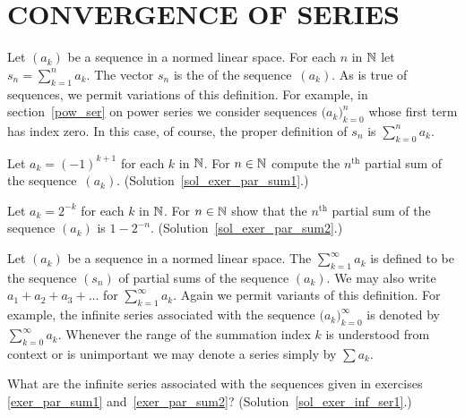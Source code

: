 \section{CONVERGENCE OF SERIES}
\begin{defn}  Let $(a_k)$ be a sequence in a normed linear space. For each $n$ in $\mathbb{N}$ let
$s_n = \sum_{k=1}^n a_k$.  The vector $s_n$ is the
 of the sequence~$(a_k)$.  As is true of sequences, we permit
variations of this definition.  For example, in section~\ref{pow_ser} on power series we
consider sequences $\bigl(a_k\bigr)_{k=0}^n$ whose first term has index zero.  In this case,
of course, the proper definition of $s_n$ is $\sum_{k=0}^n a_k$.
\end{defn}

\begin{exer}\label{exer_par_sum1}  Let $a_k = (-1)^{k+1}$ for each $k$ in $\mathbb{N}$.  For $n \in \mathbb{N}$
compute the $n^{\text{th}}$ partial sum of the sequence~$(a_k)$.
(Solution~\ref{sol_exer_par_sum1}.)
\end{exer}

\begin{exer}\label{exer_par_sum2}  Let $a_k = 2^{-k}$ for each $k$ in $\mathbb{N}$.  For $n \in \mathbb{N}$ show
that the $n^{\text{th}}$ partial sum of the sequence $(a_k)$ is $1 - 2^{-n}$.
(Solution~\ref{sol_exer_par_sum2}.)
\end{exer}

\begin{defn}  Let $(a_k)$ be a sequence in a normed linear space.  The
 $\sum_{k=1}^\infty a_k$ is defined to be the sequence $(s_n)$ of partial
sums of the sequence $(a_k)$.  We may also write $a_1 + a_2 + a_3 + \dots$ for
$\sum_{k=1}^\infty a_k$. Again we permit variants of this definition.  For example, the
infinite series associated with the sequence $\bigl(a_k\bigr)_{k=0}^\infty$ is denoted by
$\sum_{k=0}^\infty a_k$.   Whenever the range of the summation index $k$ is understood from
context or is unimportant we may denote a series simply by $\sum a_k$.
\end{defn}

\begin{exer}\label{exer_inf_ser1}  What are the infinite series associated with the sequences
given in exercises \ref{exer_par_sum1} and~\ref{exer_par_sum2}?
(Solution~\ref{sol_exer_inf_ser1}.)
\end{exer}

